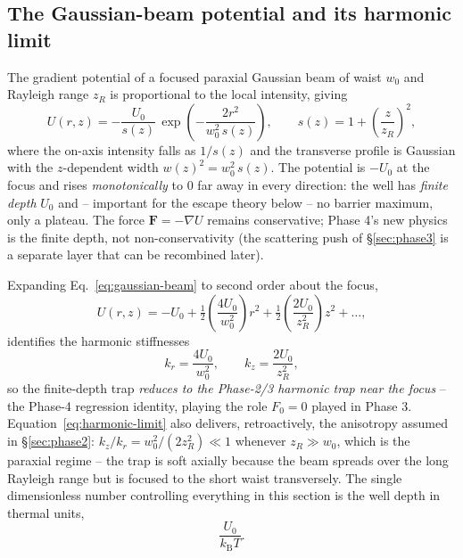 \documentclass[11pt]{article}
\newcommand{\kB}{k_{\mathrm{B}}}
\begin{document}
\subsection{The Gaussian-beam potential and its harmonic limit}
\label{sec:gaussian-beam}

The gradient potential of a focused paraxial Gaussian beam of waist $w_0$ and Rayleigh range $z_R$ is proportional to the local intensity, giving
\begin{equation}
U(r,z) = -\frac{U_0}{s(z)}\,\exp\!\left(-\frac{2r^2}{w_0^2\,s(z)}\right),
\qquad s(z) = 1 + \left(\frac{z}{z_R}\right)^{\!2},
\label{eq:gaussian-beam}
\end{equation}
where the on-axis intensity falls as $1/s(z)$ and the transverse profile is Gaussian with the $z$-dependent width $w(z)^2 = w_0^2\,s(z)$. The potential is $-U_0$ at the focus and rises \emph{monotonically} to $0$ far away in every direction: the well has \emph{finite depth} $U_0$ and -- important for the escape theory below -- no barrier maximum, only a plateau. The force $\mathbf F = -\nabla U$ remains conservative; Phase 4's new physics is the finite depth, not non-conservativity (the scattering push of \S\ref{sec:phase3} is a separate layer that can be recombined later).

Expanding Eq.~\eqref{eq:gaussian-beam} to second order about the focus,
\begin{equation}
U(r,z) = -U_0 + \tfrac12\!\left(\frac{4U_0}{w_0^2}\right) r^2
+ \tfrac12\!\left(\frac{2U_0}{z_R^2}\right) z^2 + \dots,
\end{equation}
identifies the harmonic stiffnesses
\begin{equation}
k_r = \frac{4U_0}{w_0^2}, \qquad k_z = \frac{2U_0}{z_R^2},
\label{eq:harmonic-limit}
\end{equation}
so the finite-depth trap \emph{reduces to the Phase-2/3 harmonic trap near the focus} -- the Phase-4 regression identity, playing the role $F_0=0$ played in Phase 3. Equation~\eqref{eq:harmonic-limit} also delivers, retroactively, the anisotropy assumed in \S\ref{sec:phase2}: $k_z/k_r = w_0^2/(2z_R^2) \ll 1$ whenever $z_R \gg w_0$, which is the paraxial regime -- the trap is soft axially because the beam spreads over the long Rayleigh range but is focused to the short waist transversely. The single dimensionless number controlling everything in this section is the well depth in thermal units,
\begin{equation}
\frac{U_0}{\kB T}.
\end{equation}
\end{document}

